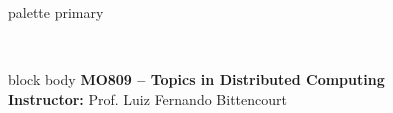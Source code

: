 
\begin{frame}[plain]
  \vfill
  \centering
  \begin{beamercolorbox}[sep=12pt,center,rounded=true]{palette primary}
      \inserttitle
  \end{beamercolorbox}
  
  \vspace{0.6cm}
  \textbf{\insertauthor} \\
  \textit{\small \MyInstitute}
  
  \vfill
  \begin{beamercolorbox}[sep=8pt,center,rounded=true]{block body}
      \textbf{MO809 -- Topics in Distributed Computing} \\
      \vspace{0.1cm}
      \small \textbf{Instructor:} Prof. Luiz Fernando Bittencourt
  \end{beamercolorbox}
  
  \vfill
  \scriptsize
  \texttt{\MyEmail} \\
  \MyDate
\end{frame}

